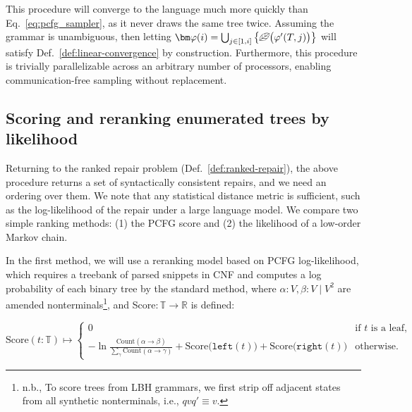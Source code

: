 \documentclass[runningheads]{llncs}
\begin{document}
  This procedure will converge to the language much more quickly than Eq.~\ref{eq:pcfg_sampler}, as it never draws the same tree twice. Assuming the grammar is unambiguous, then letting $\bm\varphi(i) = \bigcup_{j\in[1, i]} \big\{\text{\textleaf}\big(\varphi'(T, j)\big)\big\}$ will satisfy Def.~\ref{def:linear-convergence} by construction. Furthermore, this procedure is trivially parallelizable across an arbitrary number of processors, enabling communication-free sampling without replacement. %

\subsection{Scoring and reranking enumerated trees by likelihood}\label{sec:ranking}

Returning to the ranked repair problem (Def.~\ref{def:ranked-repair}), the above procedure returns a set of syntactically consistent repairs, and we need an ordering over them. We note that any statistical distance metric is sufficient, such as the log-likelihood of the repair under a large language model. We compare two simple ranking methods: (1) the PCFG score and (2) the likelihood of a low-order Markov chain.

In the first method, we will use a reranking model based on PCFG log-likelihood, which requires a treebank of parsed snippets in CNF and computes a log probability of each binary tree by the standard method, where $\alpha: V, \beta: V \mid V^2$ are amended nonterminals\footnote{n.b., To score trees from LBH grammars, we first strip off adjacent states from all synthetic nonterminals, i.e., $qvq' \equiv v$.}, and Score$: \mathbb{T} \rightarrow \mathbb{R}$ is defined:

\begin{equation}
\text{Score}(t: \mathbb{T}) \mapsto \begin{cases}
0 & \text{if $t$ is a leaf,} \\
-\ln\frac{\text{Count}(\alpha \rightarrow \beta)}{\sum_{\gamma}\text{Count}(\alpha \rightarrow \gamma)} + \text{Score}\big(\texttt{left}(t)\big) + \text{Score}\big(\texttt{right}(t)\big) & \text{otherwise.}
\end{cases}
\end{equation}
\end{document}
